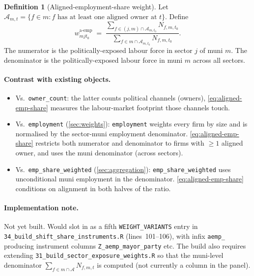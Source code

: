 \documentclass[12pt]{article}
\theoremstyle{definition}
\newtheorem{definition}{Definition}
\begin{document}
\begin{definition}[Aligned-employment-share weight]
\label{def:aligned-emp-share}
Let $\mathcal{A}_{m,t} = \{f \in m : f \text{ has at least one aligned owner at } t\}$. Define
\begin{equation}
\label{eq:aligned-emp-share}
w^{\text{a-emp}}_{m j t_0} \;=\;
\frac{\sum_{f \in (j,m) \cap \mathcal{A}_{m,t_0}} N_{f,m,t_0}}{\sum_{f \in m \cap \mathcal{A}_{m,t_0}} N_{f,m,t_0}}.
\end{equation}
The numerator is the politically-exposed labour force in sector $j$ of muni $m$. The denominator is the politically-exposed labour force in muni $m$ across all sectors.
\end{definition}

\paragraph{Contrast with existing objects.}
\begin{itemize}[leftmargin=2em, itemsep=2pt]
\item Vs.\ \texttt{owner\_count}: the latter counts political channels (owners), \cref{eq:aligned-emp-share} measures the labour-market footprint those channels touch.
\item Vs.\ \texttt{employment} (\cref{sec:weights}): \texttt{employment} weights every firm by size and is normalised by the sector-muni employment denominator. \cref{eq:aligned-emp-share} restricts both numerator and denominator to firms with $\ge 1$ aligned owner, and uses the muni denominator (across sectors).
\item Vs.\ \texttt{emp\_share\_weighted} (\cref{sec:aggregation}): \texttt{emp\_share\_weighted} uses unconditional muni employment in the denominator. \cref{eq:aligned-emp-share} conditions on alignment in both halves of the ratio.
\end{itemize}

\paragraph{Implementation note.}
Not yet built. Would slot in as a fifth \texttt{WEIGHT\_VARIANTS} entry in \texttt{34\_build\_shift\_share\_instruments.R} (lines~101--106), with infix \texttt{aemp\_} producing instrument columns \texttt{Z\_aemp\_mayor\_party} etc. The build also requires extending \texttt{31\_build\_sector\_exposure\_weights.R} so that the muni-level denominator $\sum_{f \in m \cap \mathcal{A}}\!N_{f,m,t}$ is computed (not currently a column in the panel).
\end{document}
